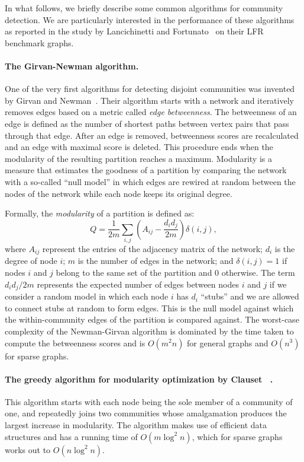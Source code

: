 In what follows, we briefly describe some common algorithms 
for community detection. We are particularly interested in the performance 
of these algorithms as reported in the study by Lancichinetti and 
Fortunato~\cite{LF09} on their LFR benchmark graphs. 

\paragraph{The Girvan-Newman algorithm.} 
One of the very first algorithms for detecting disjoint communities 
was invented by Girvan and Newman~\cite{GN02, GN04}. Their 
algorithm starts with a network and iteratively removes edges based 
on a metric called \emph{edge betweenness}. The betweenness of an 
edge is defined as the number of shortest paths between vertex pairs 
that pass through that edge. After an edge is removed, betweenness 
scores are recalculated and an edge with maximal score is deleted. 
This procedure ends when the modularity of the resulting partition
reaches a maximum. Modularity is a measure that estimates the goodness 
of a partition by comparing the network with a so-called ``null model''
in which edges are rewired at random between the nodes of the network 
while each node keeps its original degree.

Formally, the \emph{modularity} of a partition is defined as:
%
\begin{equation}\label{eqn:modularity}
	Q = \frac{1}{2m} \sum_{i, j} \left ( A_{i j} - \frac{d_i d_j}{2m} \right ) \delta(i, j),
\end{equation}
%
where $A_{ij}$ represent the entries of the adjacency matrix of the network; $d_i$ is the 
degree of node $i$; $m$ is the number of edges in the network; and $\delta(i, j) = 1$ if nodes
$i$ and $j$ belong to the same set of the partition and $0$ otherwise. The term $d_i d_j / 2m$ 
represents the expected number of edges between nodes $i$ and $j$ if we consider a random model
in which each node $i$ has $d_i$ ``stubs'' and we are allowed to connect stubs at random to form edges. 
This is the null model against which the within-community edges of the partition is compared against.
The worst-case complexity of the Newman-Girvan algorithm is dominated by the time taken 
to compute the betweenness scores and is $O(m^2 n)$ for general graphs and $O(n^3)$ for sparse graphs.

\paragraph{The greedy algorithm for modularity optimization by Clauset \etal~\cite{CNM04}.}
This algorithm starts with each node being the sole member of a community of one, and 
repeatedly joins two communities whose amalgamation produces the largest increase in modularity. 
The algorithm makes use of efficient data structures and has a running time of $O(m \log^2 n)$, 
which for sparse graphs works out to $O(n \log^2 n)$. 

